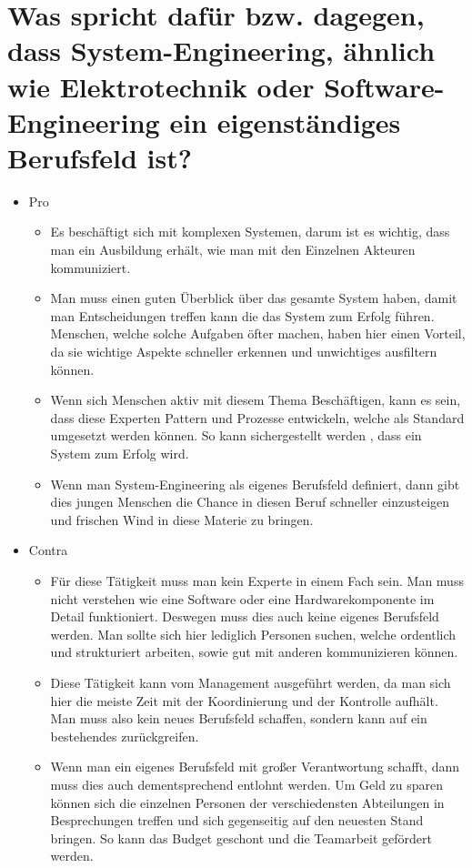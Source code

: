 \documentclass[12pt]{article}
\begin{document}
\section{Was spricht dafür bzw. dagegen, dass System-Engineering, ähnlich wie Elektrotechnik oder Software-
Engineering ein eigenständiges Berufsfeld ist?}
\begin{itemize}
 \item Pro
 \begin{itemize}
  \item Es beschäftigt sich mit komplexen Systemen, darum ist es wichtig, dass man ein Ausbildung erhält, wie man mit den Einzelnen Akteuren kommuniziert.
  \item Man muss einen guten Überblick über das gesamte System haben, damit man Entscheidungen treffen kann die das System zum Erfolg führen. Menschen, welche solche Aufgaben öfter machen, haben hier einen Vorteil, da sie wichtige Aspekte schneller erkennen und unwichtiges ausfiltern können.
  \item Wenn sich Menschen aktiv mit diesem Thema Beschäftigen, kann es sein, dass diese Experten Pattern und Prozesse entwickeln, welche als Standard umgesetzt werden können. So kann sichergestellt werden , dass ein System zum Erfolg wird.
  \item Wenn man System-Engineering als eigenes Berufsfeld definiert, dann gibt dies jungen Menschen die Chance  in diesen Beruf schneller einzusteigen und frischen Wind in diese Materie zu bringen.
 \end{itemize}
 \item Contra
 \begin{itemize}
  \item Für diese Tätigkeit muss man kein Experte in einem Fach sein. Man muss nicht verstehen wie eine Software oder eine Hardwarekomponente im Detail funktioniert. Deswegen muss dies auch keine eigenes Berufsfeld werden. Man sollte sich hier lediglich Personen suchen, welche ordentlich und strukturiert arbeiten, sowie gut mit anderen kommunizieren können.
  \item Diese Tätigkeit kann vom Management ausgeführt werden, da man sich hier die meiste Zeit mit der Koordinierung und der Kontrolle aufhält. Man muss also kein neues Berufsfeld schaffen, sondern kann auf ein bestehendes zurückgreifen.
  \item Wenn man ein eigenes Berufsfeld mit großer Verantwortung schafft, dann muss dies auch dementsprechend entlohnt werden. Um Geld zu sparen können sich die einzelnen Personen der verschiedensten Abteilungen in Besprechungen treffen und sich gegenseitig auf den neuesten Stand bringen. So kann das Budget geschont und die Teamarbeit gefördert werden.
 \end{itemize}
\end{itemize}
\vfill
\printbibliography
\end{document}
